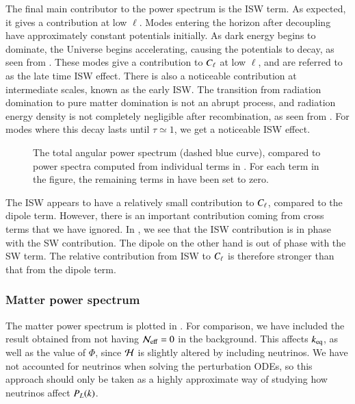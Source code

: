 The final main contributor to the power spectrum is the ISW term. As expected, it gives a contribution at low $\ell$. Modes entering the horizon after decoupling have approximately constant potentials initially. As dark energy begins to dominate, the Universe begins accelerating, causing the potentials to decay, as seen from . These modes give a contribution to $C_\ell$ at low $\ell$, and are referred to as the late time ISW effect. There is also a noticeable contribution at intermediate scales, known as the early ISW. The transition from radiation domination to pure matter domination is not an abrupt process, and radiation energy density is not completely negligible after recombination, as seen from . For modes where this decay lasts until $\tau\simeq1$, we get a noticeable ISW effect.   
\begin{figure}[ht!]
    \caption{The total angular power spectrum (dashed blue curve), compared to power spectra computed from individual terms in . For each term in the figure, the remaining terms in  have been set to zero.}
    \label{fig:M4:results:cells_components}
\end{figure}

The ISW appears to have a relatively small contribution to $C_\ell$, compared to the dipole term. However, there is an important contribution coming from cross terms that we have ignored. In , we see that the ISW contribution is in phase with the SW contribution. The dipole on the other hand is out of phase with the SW term. The relative contribution from ISW to $C_\ell$ is therefore stronger than that from the dipole term.   


\subsubsection{Matter power spectrum} \label{sssec:M4:results:matter_power_spectrum}
The matter power spectrum is plotted in . For comparison, we have included the result obtained from not having $\mathcal{N}_\mathrm{eff}=0$ in the background. This affects $k_\mathrm{eq}$, as well as the value of $\Phi$, since $\mathcal{H}$ is slightly altered by including neutrinos. We have not accounted for neutrinos when solving the perturbation ODEs, so this approach should only be taken as a highly approximate way of studying how neutrinos affect $P_L(k)$. 

